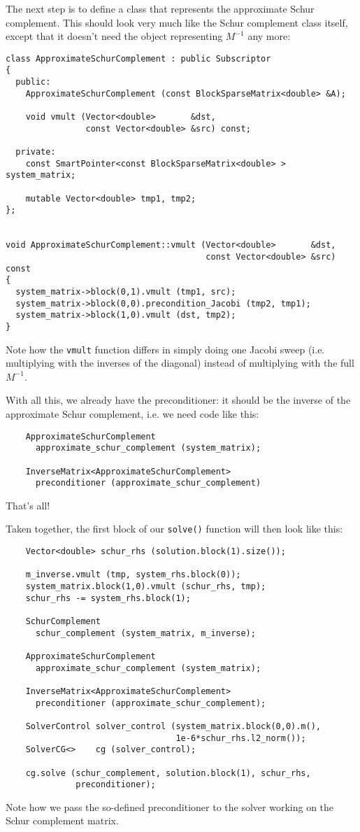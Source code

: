 \documentclass{article}
\begin{document}
The next step is to define a class that represents the approximate Schur
complement. This should look very much like the Schur complement class itself,
except that it doesn't need the object representing $M^{-1}$ any more:
\begin{verbatim}
class ApproximateSchurComplement : public Subscriptor
{
  public:
    ApproximateSchurComplement (const BlockSparseMatrix<double> &A);

    void vmult (Vector<double>       &dst,
                const Vector<double> &src) const;

  private:
    const SmartPointer<const BlockSparseMatrix<double> > system_matrix;
    
    mutable Vector<double> tmp1, tmp2;
};


void ApproximateSchurComplement::vmult (Vector<double>       &dst,
                                        const Vector<double> &src) const
{
  system_matrix->block(0,1).vmult (tmp1, src);
  system_matrix->block(0,0).precondition_Jacobi (tmp2, tmp1);
  system_matrix->block(1,0).vmult (dst, tmp2);
}
\end{verbatim}
Note how the \texttt{vmult} function differs in simply doing one Jacobi sweep
(i.e. multiplying with the inverses of the diagonal) instead of multiplying
with the full $M^{-1}$.

With all this, we already have the preconditioner: it should be the inverse of
the approximate Schur complement, i.e. we need code like this:
\begin{verbatim}
    ApproximateSchurComplement
      approximate_schur_complement (system_matrix);
      
    InverseMatrix<ApproximateSchurComplement>
      preconditioner (approximate_schur_complement)
\end{verbatim}
That's all!

Taken together, the first block of our \texttt{solve()} function will then
look like this:
\begin{verbatim}
    Vector<double> schur_rhs (solution.block(1).size());

    m_inverse.vmult (tmp, system_rhs.block(0));
    system_matrix.block(1,0).vmult (schur_rhs, tmp);
    schur_rhs -= system_rhs.block(1);

    SchurComplement
      schur_complement (system_matrix, m_inverse);
    
    ApproximateSchurComplement
      approximate_schur_complement (system_matrix);
      
    InverseMatrix<ApproximateSchurComplement>
      preconditioner (approximate_schur_complement);
    
    SolverControl solver_control (system_matrix.block(0,0).m(),
                                  1e-6*schur_rhs.l2_norm());
    SolverCG<>    cg (solver_control);

    cg.solve (schur_complement, solution.block(1), schur_rhs,
              preconditioner);
\end{verbatim}
Note how we pass the so-defined preconditioner to the solver working on the
Schur complement matrix.
\end{document}
